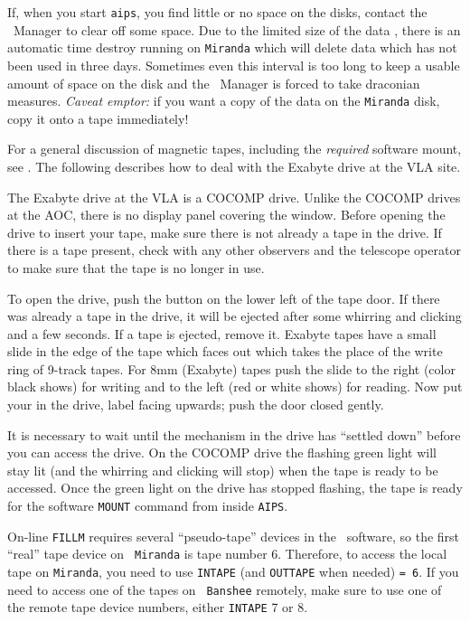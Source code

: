      If, when you start {\tt aips}, you find little or no space on the
disks, contact the \AIPS\ Manager to clear off some space.  Due to the
limited size of the data , there is an automatic time
destroy running on {\tt Miranda} which will delete data which has not
been used in three days.  Sometimes even this interval is too long to
keep a usable amount of space on the disk and the \AIPS\ Manager is
forced to take draconian measures.  {\it Caveat emptor:\/} if you want
a copy of the data on the {\tt Miranda} disk, copy it onto a tape
immediately!


    For a general discussion of magnetic tapes, including the {\it
required\/} software mount, see .  The following describes how
to deal with the Exabyte drive at the VLA site.

   The Exabyte drive at the VLA is a COCOMP drive.  Unlike the COCOMP
drives at the AOC, there is no display panel covering the window.
Before opening the drive to insert your tape, make sure there is not
already a tape in the drive.  If there is a tape present, check with
any other observers and the telescope operator to make sure that the
tape is no longer in use.

     To open the drive, push the button on the lower left of the tape
door.  If there was already a tape in the drive, it will be ejected
after some whirring and clicking and a few seconds.  If a tape is
ejected, remove it.  Exabyte tapes have a small slide in the edge of
the tape which faces out which takes the place of the write ring of
9-track tapes.  For 8mm (Exabyte) tapes push the slide to the right
(color black shows) for writing and to the left (red or white shows)
for reading.  Now put your  in the drive, label facing
upwards; push the door closed gently.

     It is necessary to wait until the mechanism in the drive has
``settled down'' before you can access the drive.  On the COCOMP drive
the flashing green light will stay lit (and the whirring and clicking
will stop) when the tape is ready to be accessed.  Once the green
light on the drive has stopped flashing, the tape is ready for the
software {\tt MOUNT} command from inside \hbox{{\tt AIPS}}.

    On-line {\tt FILLM} requires several ``pseudo-tape'' devices in
the \AIPS\ software, so the first ``real'' tape device on {\tt
Miranda} is tape number 6.  Therefore, to access the local tape on
{\tt Miranda}, you need to use {\tt INTAPE} (and {\tt OUTTAPE} when
needed) {\tt = 6}.  If you need to access one of the tapes on {\tt
Banshee} remotely, make sure to use one of the remote tape device
numbers, either {\tt INTAPE} 7 or 8.

